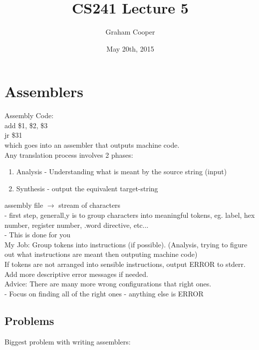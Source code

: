 \documentclass[12pt]{article}
\title{\vspace{-15ex}CS241 Lecture 5\vspace{-1ex}}
\date{May 20th, 2015}
\author{Graham Cooper}
\begin{document}
	\maketitle
	
	\section*{Assemblers}
	
	Assembly Code:\\
	add \$1, \$2, \$3\\
	jr \$31\\
	
	which goes into an assembler that outputs machine code.\\
	
	Any translation process involves 2 phases:\\
	\begin{enumerate}
		\item Analysis - Understanding what is meant by the source string (input)
		\item Synthesis - output the equivalent target-string
	\end{enumerate}
	
	assembly file $\rightarrow$ stream of characters\\
	- first step, generall,y is to group characters into meaningful tokens, eg. label, hex number, register number, .word directive, etc...\\
	- This is done for you\\
	
	My Job: Group tokens into instructions (if possible). (Analysis, trying to figure out what instructions are meant then outputing machine code)\\
	
	If tokens are not arranged into sensible instructions, output ERROR to stderr. Add more descriptive error messages if needed.\\
	
	Advice: There are many more wrong configurations that right ones.\\
	- Focus on finding all of the right ones - anything else is ERROR\\
	
	\subsection*{Problems}
	Biggest problem with writing assemblers:\\
	
\end{document}
